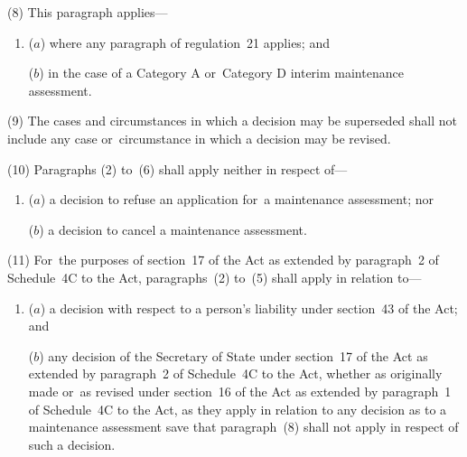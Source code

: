 \documentclass[a4paper,12pt]{article}
\begin{document}
(8) This paragraph applies---
\begin{enumerate}\item[]
($a$) where any paragraph of regulation~21 applies; and

($b$) in the case of a Category A or~Category D interim maintenance assessment.
\end{enumerate}

(9) The cases and circumstances in which a decision may be superseded shall not include any case or~circumstance in which a decision may be revised.

(10) Paragraphs (2) to~(6) shall apply neither in respect of---
\begin{enumerate}\item[]
($a$) a decision to refuse an application for~a maintenance assessment; nor

($b$) a decision to cancel a maintenance assessment.
\end{enumerate}

(11) For~the purposes of section~17 of the Act as extended by paragraph~2 of Schedule~4C to the Act, paragraphs~(2) to~(5) shall apply in relation to---
\begin{enumerate}\item[]
($a$) a decision with respect to 
a person’s liability under section~43 of the Act; and

($b$) any decision of the Secretary of State under section~17 of the Act as extended by paragraph~2 of Schedule~4C to the Act, whether as originally made or~as revised under section~16 of the Act as extended by paragraph~1 of Schedule~4C to the Act, as they apply in relation to any decision as to a maintenance assessment save that paragraph~(8) shall not apply in respect of such a decision.
\end{enumerate}

\end{document}
